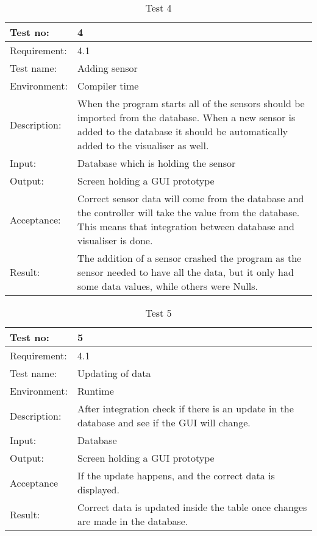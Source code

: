 \documentclass[../document.tex]{subfiles}
\begin{document}
\begin{table}[H]
\caption{Test 4}
\begin{tabularx}{\textwidth}{|l|X|}
\hline
Test no:
&4
\\ \hline Requirement:
&4.1
\\ \hline Test name:
&Adding sensor
\\ \hline Environment:
&Compiler time
\\ \hline Description:
&When the program starts all of the sensors should be imported from the database. When a new sensor is added to the database it should be automatically added to the visualiser as well.
\\ \hline Input:
&Database which is holding the sensor
\\ \hline Output:
&Screen holding a GUI prototype
\\ \hline Acceptance:
&Correct sensor data will come from the database and the controller will take the value from the database. This means that integration between database and visualiser is done.
\\ \hline Result:
&The addition of a sensor crashed the program as the sensor needed to have all the data, but it only had some data values, while others were Nulls.
\\ \hline
\end{tabularx}
\end{table}

\begin{table}[H]
\caption{Test 5}
\begin{tabularx}{\textwidth}{|l|X|}
\hline
Test no:
&5
\\ \hline Requirement:
&4.1
\\ \hline Test name:
&Updating of data
\\ \hline Environment:
&Runtime
\\ \hline Description:
&After integration check if there is an update in the database and see if the GUI will change.
\\ \hline Input:
&Database
\\ \hline Output:
&Screen holding a GUI prototype
\\ \hline Acceptance
&If the update happens, and the correct data is displayed.
\\ \hline Result:
&Correct data is updated inside the table once changes are made in the database.
\\ \hline
\end{tabularx}
\end{table}
\end{document}
